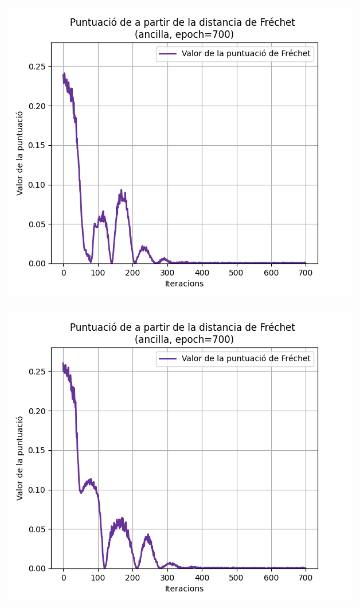 \begin{figure}
	\begin{subfigure}[b]{.32\linewidth}
		\includegraphics[width=\linewidth]{figures/data/FD_score_A4.png}
		\caption{}
	\end{subfigure}
	\begin{subfigure}[b]{.32\linewidth}
		\includegraphics[width=\linewidth]{figures/data/FD_score_A5.png}
		\caption{}
	\end{subfigure}
	\begin{subfigure}[b]{.32\linewidth}

\end{subfigure}
\end{figure}
